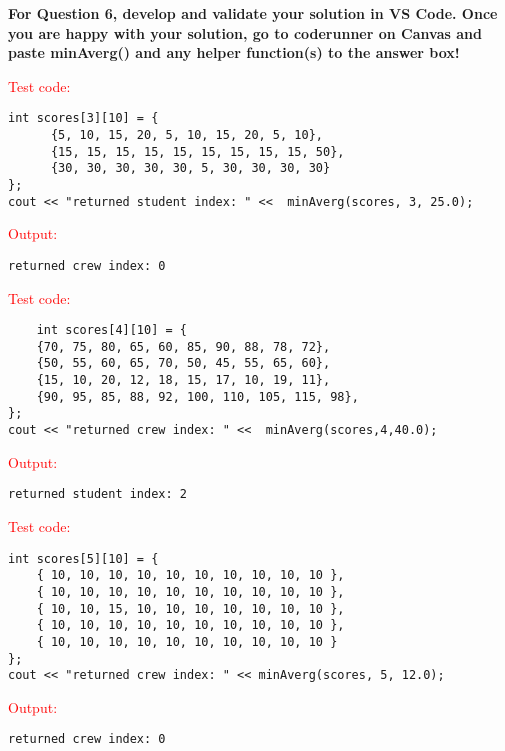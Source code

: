 \textbf{For Question 6, develop and validate your solution in VS Code. Once you are happy with your solution, go to coderunner on Canvas and paste minAverg() and any helper function(s) to the answer box!} 

\begin{sample}
\textcolor{red}{Test code:}
\begin{verbatim}
int scores[3][10] = {
      {5, 10, 15, 20, 5, 10, 15, 20, 5, 10},
      {15, 15, 15, 15, 15, 15, 15, 15, 15, 50},  
      {30, 30, 30, 30, 30, 5, 30, 30, 30, 30}
};
cout << "returned student index: " <<  minAverg(scores, 3, 25.0);
\end{verbatim}
\textcolor{red}{Output:}
\begin{verbatim}
returned crew index: 0
\end{verbatim}
\end{sample}

\begin{sample}
\textcolor{red}{Test code:}
\begin{verbatim}
    int scores[4][10] = {
    {70, 75, 80, 65, 60, 85, 90, 88, 78, 72}, 
    {50, 55, 60, 65, 70, 50, 45, 55, 65, 60},
    {15, 10, 20, 12, 18, 15, 17, 10, 19, 11},  
    {90, 95, 85, 88, 92, 100, 110, 105, 115, 98},
};
cout << "returned crew index: " <<  minAverg(scores,4,40.0);
\end{verbatim}
\textcolor{red}{Output:}
\begin{verbatim}
returned student index: 2
\end{verbatim}
\end{sample}

\begin{sample}
\textcolor{red}{Test code:}
\begin{verbatim}
int scores[5][10] = { 
    { 10, 10, 10, 10, 10, 10, 10, 10, 10, 10 },
    { 10, 10, 10, 10, 10, 10, 10, 10, 10, 10 },
    { 10, 10, 15, 10, 10, 10, 10, 10, 10, 10 },
    { 10, 10, 10, 10, 10, 10, 10, 10, 10, 10 },
    { 10, 10, 10, 10, 10, 10, 10, 10, 10, 10 }
};
cout << "returned crew index: " << minAverg(scores, 5, 12.0);
\end{verbatim}
\textcolor{red}{Output:}
\begin{verbatim}
returned crew index: 0
\end{verbatim}
\end{sample}













